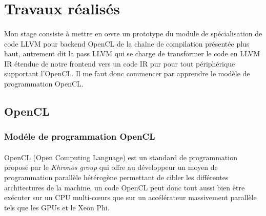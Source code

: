 \section{Travaux réalisés}
\paragraph{}
Mon stage consiste à mettre en \oe{}vre un prototype du module de spécialisation
de code LLVM pour backend OpenCL de la chaîne de compilation présentée plus
haut, autrement dit la pass LLVM qui se charge de transformer le code en LLVM IR
étendue de notre frontend vers un code IR pur pour tout périphérique supportant
l'OpenCL. Il me faut donc commencer par apprendre le modèle de programmation
OpenCL.

\subsection{OpenCL}
\subsubsection{Modéle de programmation OpenCL}
\paragraph{}
OpenCL (Open Computing Language) est un standard de programmation proposé par le
\emph{Khronos group} qui offre au développeur un moyen de programmation
parallèle hétérogène permettant de cibler les différentes architectures de la
machine, un code OpenCL peut donc tout aussi bien être exécuter sur un CPU
multi-c\oe{}urs que sur un accélérateur massivement parallèle tels que les GPUs
et le Xeon Phi.

